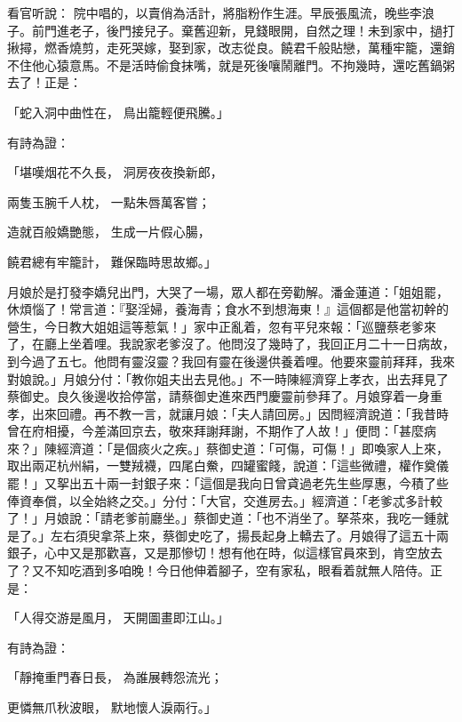 看官听說： 院中唱的，以賣俏為活計，將脂粉作生涯。早辰張風流，晚些李浪子。前門進老子，後門接兒子。棄舊迎新，見錢眼開，自然之理！未到家中，撾打揪撏，燃香燒剪，走死哭嫁，娶到家，改志從良。饒君千般貼戀，萬種牢籠，還銷不住他心猿意馬。不是活時偷食抹嘴，就是死後嚷鬧離門。不拘幾時，還吃舊鍋粥去了！正是：

「蛇入洞中曲性在，  鳥出籠輕便飛騰。」

有詩為證：

「堪嘆烟花不久長，  洞房夜夜換新郎，

兩隻玉腕千人枕，  一點朱唇萬客嘗；

造就百般嬌艷態，  生成一片假心腸，

饒君總有牢籠計，  難保臨時思故鄉。」

月娘於是打發李嬌兒出門，大哭了一場，眾人都在旁勸解。潘金蓮道：「姐姐罷，休煩惱了！常言道：『娶淫婦，養海青；食水不到想海東！』這個都是他當初幹的營生，今日教大姐姐這等惹氣！」家中正亂着，忽有平兒來報：「巡鹽蔡老爹來了，在廳上坐着哩。我說家老爹沒了。他問沒了幾時了，我回正月二十一日病故，到今過了五七。他問有靈沒靈？我回有靈在後邊供養着哩。他要來靈前拜拜，我來對娘說。」月娘分付：「教你姐夫出去見他。」不一時陳經濟穿上孝衣，出去拜見了蔡御史。良久後邊收拾停當，請蔡御史進來西門慶靈前參拜了。月娘穿着一身重孝，出來回禮。再不教一言，就讓月娘：「夫人請回房。」因問經濟說道：「我昔時曾在府相擾，今差滿回京去，敬來拜謝拜謝，不期作了人故！」便問：「甚麼病來？」陳經濟道：「是個痰火之疾。」蔡御史道：「可傷，可傷！」即喚家人上來，取出兩疋杭州絹，一雙羢襪，四尾白鮝，四罐蜜餞，說道：「這些微禮，權作奠儀罷！」又挐出五十兩一封銀子來：「這個是我向日曾貣過老先生些厚惠，今積了些俸資奉償，以全始終之交。」分付：「大官，交進房去。」經濟道：「老爹忒多計較了！」月娘說：「請老爹前廳坐。」蔡御史道：「也不消坐了。拏茶來，我吃一鍾就是了。」左右須臾拿茶上來，蔡御史吃了，揚長起身上轎去了。月娘得了這五十兩銀子，心中又是那歡喜，又是那慘切！想有他在時，似這樣官員來到，肯空放去了？又不知吃酒到多咱晚！今日他伸着腳子，空有家私，眼看着就無人陪侍。正是：

「人得交游是風月，  天開圖畫即江山。」

有詩為證：

「靜掩重門春日長，  為誰展轉怨流光；

更憐無爪秋波眼，  默地懷人淚兩行。」

